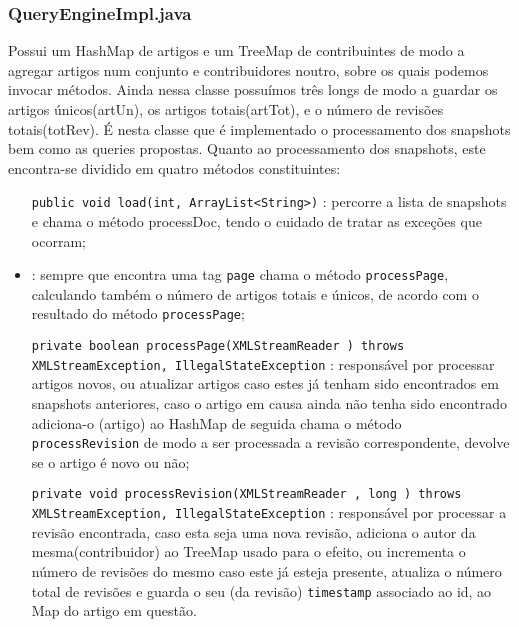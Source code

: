 \documentclass[a4paper,11pt]{article}
\begin{document}
\subsubsection{QueryEngineImpl.java}
Possui um HashMap de artigos e um TreeMap de contribuintes de modo a agregar artigos num conjunto e contribuidores noutro, sobre os quais podemos invocar métodos. Ainda nessa classe possuímos três longs de modo a guardar os artigos únicos(artUn), os artigos totais(artTot), e o número de revisões totais(totRev). É nesta classe que é implementado o processamento dos snapshots bem como as queries propostas. Quanto ao processamento dos snapshots, este encontra-se dividido em quatro métodos constituintes:
\begin{itemize}[align=left]
\item[\texttt{public void load(int, ArrayList<String>)}] : percorre a lista de snapshots e chama o método processDoc, tendo o cuidado de tratar as exceções que ocorram;
\item[{\texttt{private void processDoc(FileInputStream )\\throws IllegalStateException, XMLStreamException, FactoryConfigurationError}] : sempre que encontra uma tag \texttt{page} chama o método \texttt{processPage}, calculando também o número de artigos totais e únicos, de acordo com o resultado do método \texttt{processPage};
\item[\texttt{private boolean processPage(XMLStreamReader ) throws XMLStreamException, IllegalStateException}]: responsável por processar artigos novos, ou atualizar artigos caso estes já tenham sido encontrados em snapshots anteriores, caso o artigo em causa ainda não tenha sido encontrado adiciona-o (artigo) ao HashMap de seguida chama o método \texttt{processRevision} de modo a ser processada a revisão correspondente, devolve se o artigo é novo ou não;
\item[\texttt{private void processRevision(XMLStreamReader , long ) throws XMLStreamException, IllegalStateException}]: responsável por processar a revisão encontrada, caso esta seja uma nova revisão, adiciona o autor da mesma(contribuidor) ao TreeMap usado para o efeito, ou incrementa o número de revisões do mesmo caso este já esteja presente, atualiza o número total de revisões e guarda o seu (da revisão) \texttt{timestamp} associado ao id, ao Map do artigo em questão.
\end{itemize}
\end{document}
